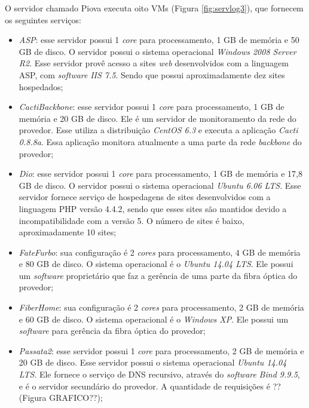 O servidor chamado Piova executa oito \ac{VM}s (Figura \ref{fig:servlog3}), que fornecem os seguintes serviços:
\begin{itemize}
 \item \textit{ASP}: esse servidor possui 1 \textit{core} para processamento, 1 GB de memória e 50 GB de disco. O servidor possui o sistema 
 operacional \textit{Windows 2008 Server R2}. Esse servidor provê acesso a sites \textit{web} desenvolvidos com a linguagem \ac{ASP}, com
 \textit{software} \textit{\ac{IIS} 7.5}. Sendo que possui aproximadamente dez sites hospedados;
 
 \item \textit{CactiBackbone}: esse servidor possui 1 \textit{core} para processamento, 1 GB de memória e 20 GB de disco. Ele é um servidor
 de monitoramento da rede do provedor. Esse utiliza a distribuição \textit{CentOS 6.3} e executa a aplicação \textit{Cacti 0.8.8a}. 
 Essa aplicação monitora atualmente a uma parte da rede \textit{backbone} do provedor;
 
 \item \textit{Dio}: esse servidor possui 1 \textit{core} para processamento, 1 GB de memória e 17,8 GB de disco. O servidor possui o sistema 
 operacional \textit{Ubuntu 6.06 \ac{LTS}}. Esse servidor fornece serviço de hospedagens de sites desenvolvidos com a linguagem \ac{PHP} 
 versão 4.4.2, sendo que esses sites são mantidos devido a incompatibilidade com a versão 5. O número de sites é baixo, aproximadamente 10 sites;
 
 \item \textit{FateFurbo}: sua configuração é 2 \textit{cores} para processamento, 4 GB de memória e 80 GB de disco. O sistema operacional é o 
 \textit{Ubuntu 14.04 \ac{LTS}}. Ele possui um \textit{software} proprietário que faz a gerência de uma parte da fibra óptica do provedor;
 
 \item \textit{FiberHome}: sua configuração é 2 \textit{cores} para processamento, 2 GB de memória e 60 GB de disco. O sistema operacional é o 
 \textit{Windows XP}. Ele possui um \textit{software} para gerência da fibra óptica do provedor;
 
 \item \textit{Passata2}: esse servidor possui 1 \textit{core} para processamento, 2 GB de memória e 20 GB de disco. Esse servidor possui o 
 sistema operacional \textit{Ubuntu 14.04 \ac{LTS}}. Ele fornece o serviço de \ac{DNS} recursivo, através do \textit{software} 
 \textit{Bind 9.9.5}, e é o servidor secundário do provedor. A quantidade de requisições é ?? (Figura GRAFICO??);
 

\end{itemize}
